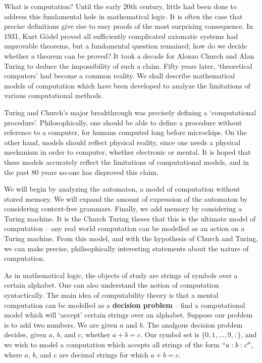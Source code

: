 What is computation? Until the early 20th century, little had been done to address this fundamental hole in mathematical logic. It is often the case that precise definitions give rise to easy proofs of the most surprising consequence. In 1931, Kurt G\"{o}del proved all sufficiently complicated axiomatic systems had unprovable theorems, but a fundamental question remained; how do we decide whether a theorem can be proved? It took a decade for Alonzo Church and Alan Turing to deduce the impossibility of such a claim. Fifty years later, `theoretical computers' had become a common reality. We shall describe mathematical models of computation which have been developed to analyze the limitations of various computational methods.

Turing and Church's major breakthrough was precisely defining a `computational procedure'. Philosophically, one should be able to define a procedure without reference to a computer, for humans computed long before microchips. On the other hand, models should reflect physical reality, since one needs a physical mechanism in order to computer, whether electronic or mental. It is hoped that these models accurately reflect the limitations of computational models, and in the past 80 years no-one has disproved this claim.

We will begin by analyzing the automaton, a model of computation without stored memory. We will expand the amount of expression of the automaton by considering context-free grammars. Finally, we add memory by considering a Turing machine. It is the Church Turing theses that this is the ultimate model of computation -- any real world computation can be modelled as an action on a Turing machine. From this model, and with the hypothesis of Church and Turing, we can make precise, philisophically interesting statements about the nature of computation.

As in mathematical logic, the objects of study are strings of symbols over a certain alphabet. One can also understand the notion of computation syntactically. The main idea of computability theory is that a mental computation can be modelled as a {\bf decision problem} -- find a computational model which will `accept' certain strings over an alphabet. Suppose our problem is to add two numbers. We are given $a$ and $b$. The analgous decision problem decides, given $a$, $b$, and $c$, whether $a + b = c$. Our symbol set is $\{ 0, 1, \dots, 9, : \}$, and we wish to model a computation which accepts all strings of the form $``a:b:c''$, where $a$, $b$, and $c$ are decimal strings for which $a + b = c$.


